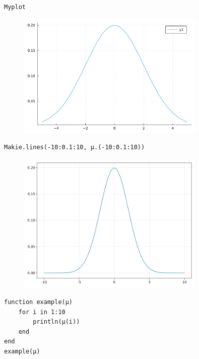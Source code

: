 \begin{verbatim}
Myplot

\end{verbatim}

\begin{figure}[H]
	\centering
	\includegraphics[width=0.8\textwidth]{./figures/jupyternotebook_figure1.pdf}
	\label{fig:jupyternotebook_figure1}

\end{figure}

\begin{lstlisting}[language=JuliaLocal, style=julia]
Makie.lines(-10:0.1:10, μ.(-10:0.1:10))
\end{lstlisting}

\begin{figure}[H]
	\centering
	\includegraphics[width=0.8\textwidth]{./figures/jupyternotebook_figure2.png}
	\label{fig:jupyternotebook_figure2.png}

\end{figure}

\begin{lstlisting}[language=JuliaLocal, style=julia]
function example(μ)
    for i in 1:10
        println(μ(i))
    end
end
example(μ)
\end{lstlisting}

